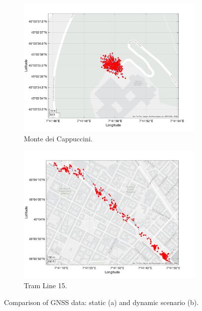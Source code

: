         \vspace{-0.5cm} %

        \begin{figure}[h!]
            \centering
            \begin{subfigure}{0.23\textwidth}
                \centering
                \includegraphics[width=\textwidth]{images/tests/Monte_Cappuccini/png/Samsung_A51_Monte_Cappuccini_fig6.png}
                \caption{Monte dei Cappuccini.}
                \label{fig:static_scenario}
            \end{subfigure}
            \hfill
            \begin{subfigure}{0.23\textwidth}
                \centering
                \includegraphics[width=\textwidth]{images/tests/Tram_15_trip_Castello_to_Pescatore/filtered/Samsung_A51_Tram_15_trip_Castello_to_Pescatore_fig6.png}
                \caption{Tram Line 15.}
                \label{fig:dynamic_scenario}
            \end{subfigure}
            \vspace{0.35cm}
            \caption{Comparison of GNSS data: static (a) and dynamic scenario (b).}
            \label{fig:gnss_comparison}
        \end{figure}

